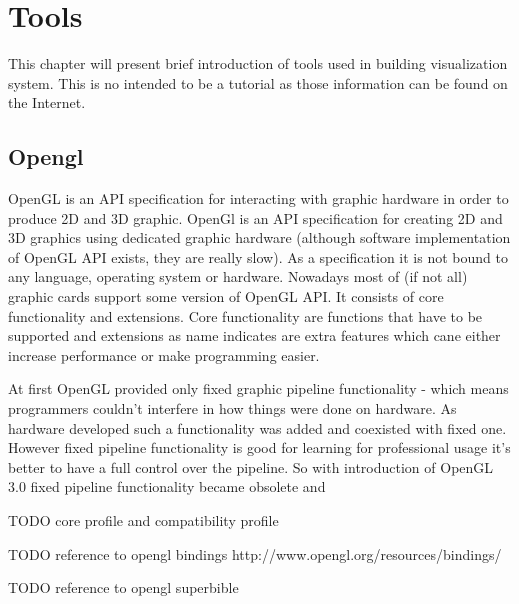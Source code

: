 

\chapter{Tools}


\graphicspath{{tools/figures/}}


This chapter will present brief introduction of tools used in building visualization system. This is no intended to be a tutorial as those information can be found on the Internet. 

\section{Opengl}
OpenGL is an API specification for interacting with graphic hardware in order to produce 2D and 3D graphic. 
OpenGl is an API specification for creating 2D and 3D graphics using dedicated graphic hardware (although software implementation of OpenGL API exists, they are really slow). As a specification it is not bound to any language, operating system or hardware. Nowadays most of (if not all) graphic cards support some version of OpenGL API. It consists of core functionality and extensions. Core functionality are functions that have to be supported and extensions as name indicates are extra features which cane either increase performance or make programming easier.

At first OpenGL provided only fixed graphic pipeline functionality - which means programmers couldn't interfere in how things were done on hardware. As hardware developed such a functionality was added and coexisted with fixed one. However fixed pipeline functionality is good for learning for professional usage it's better to have a full control over the pipeline. So with introduction of OpenGL 3.0 fixed pipeline functionality became obsolete and 

TODO core profile and compatibility profile

TODO reference to opengl bindings http://www.opengl.org/resources/bindings/

TODO reference to opengl superbible


